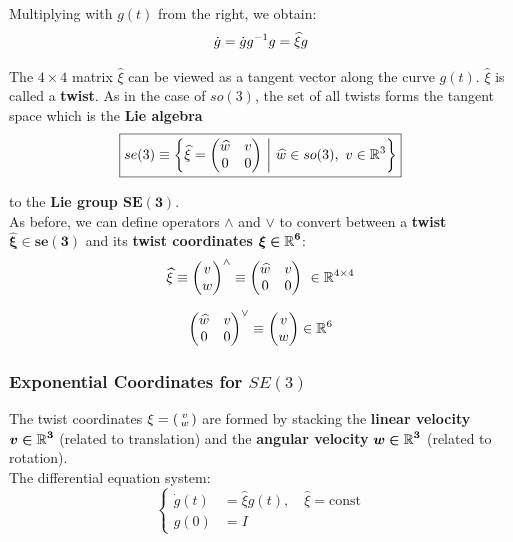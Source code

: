 Multiplying with $g(t)$ from the right, we obtain:
	\[\dot{g} = \dot{g}g^{-1}g = \widehat{\xi}g\]

The $4 \times 4$ matrix $\widehat{\xi}$ can be viewed as a tangent vector
along the curve $g(t)$. $\widehat{\xi}$ is called a \textbf{twist}.
As in the case of $so(3)$, the set of all twists forms the tangent
space which is the \textbf{Lie algebra}
	\[\boxed{se(3) \equiv \left\{ \widehat{\xi} = \begin{pmatrix}
		\widehat{w} & v \\
		0 & 0 \\
	\end{pmatrix}\ \middle|
	\ \widehat{w} \in so(3),\ v \in \mathbb{R}^3 \right\}}\]

	to the \textbf{Lie group $\bm{SE(3)}$}.\\

As before, we can define operators $\wedge$ and $\vee$ to convert between
a \textbf{twist $\bm{\widehat{\xi} \in se(3)}$} and its
\textbf{twist coordinates} $\bm{ \xi \in \mathbb{R}^6 }$:
	\[\widehat{\xi} \equiv \begin{pmatrix} v \\ w \end{pmatrix}^{\wedge}
		\equiv \begin{pmatrix}
			\widehat{w} & v \\
			0 & 0
		\end{pmatrix}\ \in \mathbb{R}^{4 \times{} 4}\]

	\[\begin{pmatrix}
		\widehat{w} & v \\
		0 & 0
	\end{pmatrix}^{\vee} \equiv \begin{pmatrix} v \\ w \end{pmatrix} \in \mathbb{R}^6\]


\subsubsection{Exponential Coordinates for $SE(3)$}%
\label{ssub:exponential_coordinates_for_se_3_}

The twist coordinates $\xi = \left(\begin{smallmatrix} v\\w \end{smallmatrix} \right)$ are formed by stacking the
\textbf{linear velocity} $\bm{v \in \mathbb{R}^3}$ (related to translation) and the
\textbf{angular velocity} $\bm{w \in \mathbb{R}^3}$ (related to rotation).\\

The differential equation system:
	\[\left\{ \begin{aligned}
		\dot{g}(t) &= \widehat{\xi}g(t), \quad \widehat{\xi} = \text{const}\\
		g(0) &= I
	\end{aligned} \right.\]

